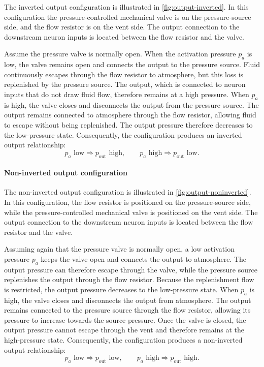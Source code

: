 \documentclass[11pt,a4paper]{article}
\numberwithin{equation}{section}
\newcommand{\pout}{p_{\mathrm{out}}}
\begin{document}
The inverted output configuration is illustrated in \cref{fig:output-inverted}. In this configuration the
pressure-controlled mechanical valve is on the pressure-source side, and the flow resistor is on the vent side. The
output connection to the downstream neuron inputs is located between the flow resistor and the valve.

Assume the pressure valve is normally open. When the activation pressure $p_a$ is low, the valve remains open and
connects the output to the pressure source. Fluid continuously escapes through the flow resistor to atmosphere, but
this loss is replenished by the pressure source. The output, which is connected to neuron inputs that do not draw
fluid flow, therefore remains at a high pressure. When $p_a$ is high, the valve closes and disconnects the output
from the pressure source. The output remains connected to atmosphere through the flow resistor, allowing fluid to
escape without being replenished. The output pressure therefore decreases to the low-pressure state. Consequently,
the configuration produces an inverted output relationship:
\begin{equation*}
  p_a \text{ low} \Rightarrow \pout \text{ high}, \qquad
  p_a \text{ high} \Rightarrow \pout \text{ low}.
\end{equation*}

\paragraph{Non-inverted output configuration}

The non-inverted output configuration is illustrated in \cref{fig:output-noninverted}. In this configuration, the
flow resistor is positioned on the pressure-source side, while the pressure-controlled mechanical valve is positioned
on the vent side. The output connection to the downstream neuron inputs is located between the flow resistor and
the valve.

Assuming again that the pressure valve is normally open, a low activation pressure $p_a$ keeps the valve open and
connects the output to atmosphere. The output pressure can therefore escape through the valve, while the pressure
source replenishes the output through the flow resistor. Because the replenishment flow is restricted, the output
pressure decreases to the low-pressure state. When $p_a$ is high, the valve closes and disconnects the output from
atmosphere. The output remains connected to the pressure source through the flow resistor, allowing its pressure to
increase towards the source pressure. Once the valve is closed, the output pressure cannot escape through the vent
and therefore remains at the high-pressure state. Consequently, the configuration produces a non-inverted output
relationship:
\begin{equation*}
  p_a \text{ low} \Rightarrow \pout \text{ low}, \qquad
  p_a \text{ high} \Rightarrow \pout \text{ high}.
\end{equation*}
\end{document}
